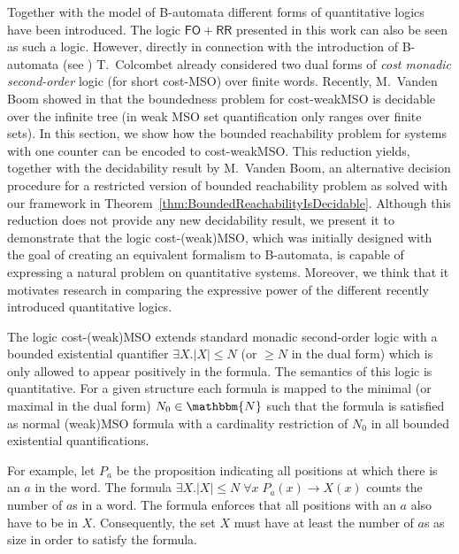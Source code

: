 \documentclass{LMCS}
\newcommand{\nat}{\mathbbm{N}}
\newcommand{\FORR}{\ensuremath{\mathsf{FO\!\!+\!\!RR}}}
\begin{document}
Together with the model of B-automata different forms of quantitative logics
have been introduced. The logic \FORR{} presented in this work can also be seen as such a logic. However, directly in connection
with the introduction of B-automata (see \cite{regularcostfunctions}) T.\
Colcombet already considered two dual forms of \emph{cost monadic second-order} logic
(for short cost-MSO) over finite words. Recently, M.\ Vanden Boom showed in
\cite{costwMSO} that the boundedness problem for cost-weakMSO is decidable over
the infinite tree (in weak MSO set quantification only ranges over finite
sets). In this section, we show how the bounded reachability problem for systems 
with one counter can be encoded to cost-weakMSO. This reduction yields,
together with the decidability result by M.\ Vanden Boom, an alternative decision
procedure for a restricted version of bounded reachability problem as solved
with our framework in Theorem~\ref{thm:BoundedReachabilityIsDecidable}. 
Although this reduction does not provide any new decidability result, we 
present it to demonstrate that the logic cost-(weak)MSO, which was initially designed
with the goal of creating an equivalent formalism to B-automata, is capable 
of expressing a natural problem on quantitative systems. Moreover, we think that
it motivates research in comparing the expressive power of the different 
recently introduced quantitative logics.

The logic cost-(weak)MSO extends standard monadic second-order logic with
a bounded existential quantifier $\exists X . |X| \le N$ (or $\ge N$
in the dual form) which is only allowed to appear positively in the
formula. The semantics of this logic is quantitative. For a given
structure each formula is mapped to the minimal (or maximal in the dual form)
$N_0 \in \nat$ such
that the formula is satisfied as normal (weak)MSO formula with a
cardinality restriction of $N_0$ in all bounded existential
quantifications.

For example, let $P_a$ be the proposition indicating all positions at which
there is an $a$ in the word. The formula $\exists X . |X| \le N \;\forall x\;
P_a(x) \rightarrow X(x)$ counts the number of $a$s in a word. The formula
enforces that all positions with an $a$ also have to be in $X$. Consequently,
the set $X$ must have at least the number of $a$s as size in order to satisfy the formula.
\end{document}
